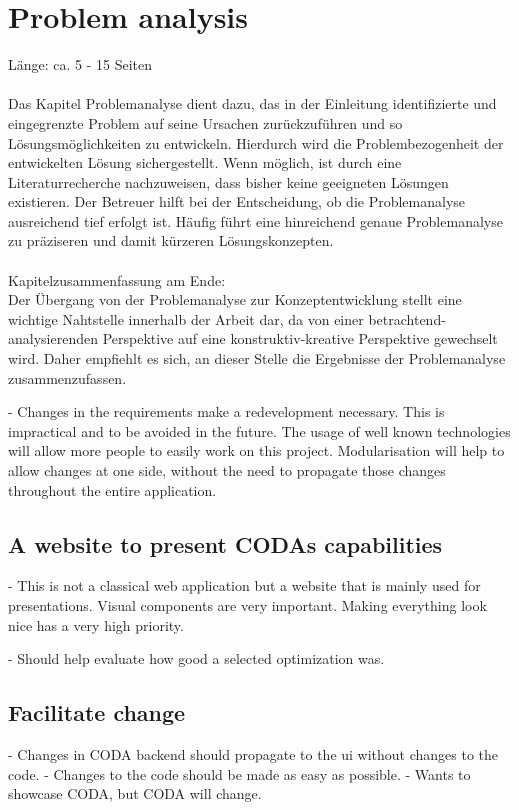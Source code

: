 \chapter{Problem analysis}
Länge: ca. 5 - 15 Seiten\\\\
Das Kapitel Problemanalyse dient dazu, das in der Einleitung identifizierte und eingegrenzte Problem auf seine Ursachen zurückzuführen und so Lösungsmöglichkeiten zu entwickeln. Hierdurch wird die Problembezogenheit der entwickelten Lösung sichergestellt. Wenn möglich, ist durch eine Literaturrecherche nachzuweisen, dass bisher keine geeigneten Lösungen existieren. Der Betreuer hilft bei der Entscheidung, ob die Problemanalyse ausreichend tief erfolgt ist. Häufig führt eine hinreichend genaue Problemanalyse zu präziseren und damit kürzeren Lösungskonzepten.\\\\

\noindent Kapitelzusammenfassung am Ende:\\
Der Übergang von der Problemanalyse zur Konzeptentwicklung stellt eine wichtige Nahtstelle innerhalb der Arbeit dar, da von einer betrachtend-analysierenden Perspektive auf eine konstruktiv-kreative Perspektive gewechselt wird. Daher empfiehlt es sich, an dieser Stelle die Ergebnisse der Problemanalyse zusammenzufassen.


- Changes in the requirements make a redevelopment necessary. This is impractical and to be avoided in the future. The usage of well known technologies will allow more people to easily work on this project. Modularisation will help to allow changes at one side, without the need to propagate those changes throughout the entire application.

\section{A website to present CODAs capabilities}
- This is not a classical web application but a website that is mainly used for presentations. Visual components are very important. Making everything look nice has a very high priority.

- Should help evaluate how good a selected optimization was. 

\section{Facilitate change}
- Changes in CODA backend should propagate to the ui without changes to the code. 
- Changes to the code should be made as easy as possible.
- Wants to showcase CODA, but CODA will change.


